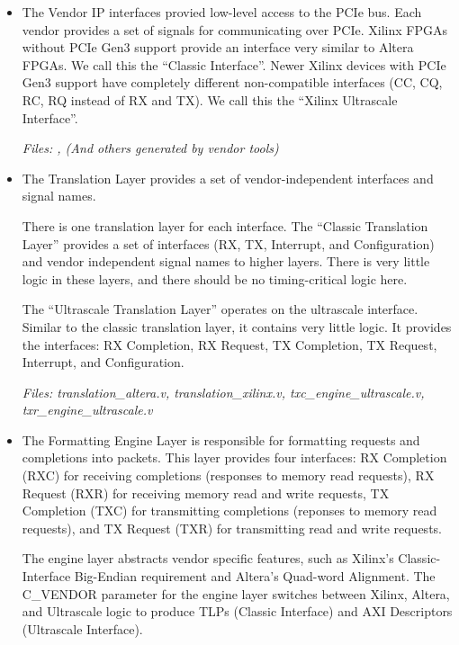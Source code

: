 \documentclass{refrep}
\newcommand{\Xilinx}[1]{{\color{red}{#1}}}
\newcommand{\Altera}[1]{{\color{blue}{#1}}}
\begin{document}
\begin{itemize}
\item \textbf{\color{red}{IP Interfaces}} The Vendor IP interfaces provied
  low-level access to the PCIe bus. Each vendor provides a set of signals for
  communicating over PCIe. Xilinx FPGAs without PCIe Gen3 support provide an
  interface very similar to Altera FPGAs. We call this the ``Classic
  Interface''. Newer Xilinx devices with PCIe Gen3 support have completely
  different non-compatible interfaces (CC, CQ, RC, RQ instead of RX and TX). We
  call this the ``Xilinx Ultrascale Interface''.

  \textit{Files: \Xilinx{*.xci}, \Altera{*.qsys} (And others generated by vendor
    tools)}

\item \textbf{\color{orange}{Translation Layer}} The Translation Layer provides
  a set of vendor-independent interfaces and signal names. 

  There is one translation layer for each interface. The ``Classic Translation
  Layer'' provides a set of interfaces (RX, TX, Interrupt, and Configuration)
  and vendor independent signal names to higher layers. There is very little
  logic in these layers, and there should be no timing-critical logic here.

  The ``Ultrascale Translation Layer'' operates on the ultrascale
  interface. Similar to the classic translation layer, it contains very little
  logic. It provides the interfaces: RX Completion, RX Request, TX
  Completion, TX Request, Interrupt, and Configuration. 

  \textit{Files: translation\_altera.v, translation\_xilinx.v,
    txc\_engine\_ultrascale.v,\\ txr\_engine\_ultrascale.v}

\item \textbf{\color{yellow}{Formatting Engine Layer}} The Formatting Engine
  Layer is responsible for formatting requests and completions into
  packets. This layer provides four interfaces: RX Completion (RXC) for
  receiving completions (responses to memory read requests), RX Request (RXR)
  for receiving memory read and write requests, TX Completion (TXC) for
  transmitting completions (reponses to memory read requests), and TX Request
  (TXR) for transmitting read and write requests.
  
  The engine layer abstracts vendor specific features, such as Xilinx's
  Classic-Interface Big-Endian requirement and Altera's Quad-word
  Alignment. The C\_VENDOR parameter for the engine layer switches between
  Xilinx, Altera, and Ultrascale logic to produce TLPs (Classic Interface) and
  AXI Descriptors (Ultrascale Interface).


\end{itemize}
\end{document}

